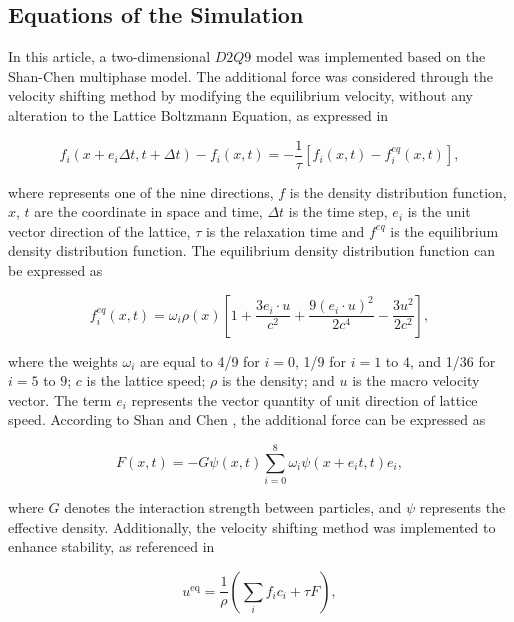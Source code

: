 \documentclass[review]{elsarticle}
\begin{document}
\subsection{Equations of the Simulation}
In this article, a two-dimensional $D2Q9$ model was implemented based on the Shan-Chen multiphase model. The additional force was considered through the velocity shifting method by modifying the equilibrium velocity, without any alteration to the Lattice Boltzmann Equation, as expressed in \cite{kruger2017lattice}
\begin{linenomath*}
\begin{equation}
	f_i\left(x+e_i \Delta t, t+\Delta t\right)-f_i(x, t)=-\frac{1}{\tau}\left[f_i(x, t)-f_i^{e q}(x, t)\right],
\end{equation}
\end{linenomath*}
where represents one of the nine directions, $f$ is the density distribution function, $x$, $t$ are the coordinate in space and time, $\Delta t$ is the time step, $e_i$ is the unit vector direction of the lattice, $\tau$ is the relaxation time and $f^{eq}$ is the equilibrium density distribution function.
The equilibrium density distribution function can be expressed as \cite{mohamad2011lattice}
\begin{linenomath*}
\begin{equation}
	f_i^{e q}(x, t)=\omega_i \rho(x)\left[1+\frac{3 e_i \cdot u}{c^2}+\frac{9\left(e_i \cdot u\right)^2}{2 c^4}-\frac{3 u^2}{2 c^2}\right],
\end{equation}
\end{linenomath*}
where the weights $\omega_i$ are equal to 4/9 for $i=0$, 1/9 for $i=1$ to $4$, and 1/36 for $i=5$ to $9$; $c$ is the lattice speed; $\rho$ is the density; and $u$ is the macro velocity vector. The term $e_i$ represents the vector quantity of unit direction of lattice speed. According to Shan and Chen \cite{shan1993lattice}, the additional force can be expressed as
\begin{linenomath*}
\begin{equation}
	F(x, t)=-G \psi(x, t) \sum_{i=0}^8 \omega_i \psi\left(x+e_i t, t\right) e_i,
\end{equation}
\end{linenomath*}
where $G$ denotes the interaction strength between particles, and $\psi$ represents the effective density. Additionally, the velocity shifting method was implemented to enhance stability, as referenced in \cite{kruger2017lattice}
\begin{linenomath*}
\begin{equation}
	u^{\mathrm{eq}}=\frac{1}{\rho}\left(\sum_i f_i c_i+\tau F\right),
\end{equation}
\end{linenomath*}
\end{document}
